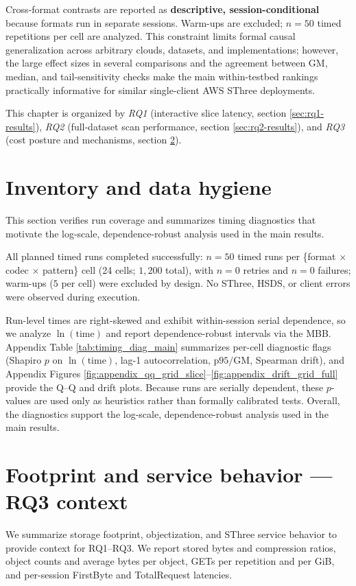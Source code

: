 \documentclass[nomenclature, english, bibtex]{kththesis}
\numberwithin{listing}{chapter}
\begin{document}
Cross-format contrasts are reported as \textbf{descriptive, session-conditional} because formats run in separate sessions. Warm-ups are excluded; $n=50$ timed repetitions per cell are analyzed. This constraint limits formal causal generalization across arbitrary clouds, datasets, and implementations; however, the large effect sizes in several comparisons and the agreement between \gls{GM}, median, and tail-sensitivity checks make the main within-testbed rankings practically informative for similar single-client \gls{AWS} \gls{SThree} deployments.

This chapter is organized by \emph{RQ1} (interactive slice latency, section \ref{sec:rq1-results}), \emph{RQ2} (full-dataset scan performance, section \ref{sec:rq2-results}), and \emph{RQ3} (cost posture and mechanisms, section \ref{sec:rq3-results}).

\section{Inventory and data hygiene}
\label{sec:results-inventory}
This section verifies run coverage and summarizes timing diagnostics that motivate the log-scale, dependence-robust analysis used in the main results.

\label{sec:run-inclusion-and-coverage}
All planned timed runs completed successfully: $n=50$ timed runs per \{format $\times$ codec $\times$ pattern\} cell (24 cells; $1{,}200$ total), with $n=0$ retries and $n=0$ failures; warm-ups ($5$ per cell) were excluded by design. No \gls{SThree}, \gls{HSDS}, or client errors were observed during execution.

Run-level times are right-skewed and exhibit within-session serial dependence, so we analyze $\ln(\text{time})$ and report dependence-robust intervals via the \gls{MBB}. Appendix Table \ref{tab:timing_diag_main} summarizes per-cell diagnostic flags (Shapiro $p$ on $\ln(\text{time})$, lag-1 autocorrelation, $\mathrm{p95}/\mathrm{GM}$, Spearman drift), and Appendix Figures \ref{fig:appendix_qq_grid_slice}–\ref{fig:appendix_drift_grid_full} provide the Q–Q and drift plots. Because runs are serially dependent, these $p$-values are used only as heuristics rather than formally calibrated tests. Overall, the diagnostics support the log-scale, dependence-robust analysis used in the main results.

\section{Footprint and service behavior — RQ3 context}
\label{sec:rq3-results}
We summarize storage footprint, objectization, and \gls{SThree} service behavior to provide context for RQ1–RQ3. We report stored bytes and compression ratios, object counts and average bytes per object, GETs per repetition and per GiB, and per-session FirstByte and TotalRequest latencies.
\end{document}

